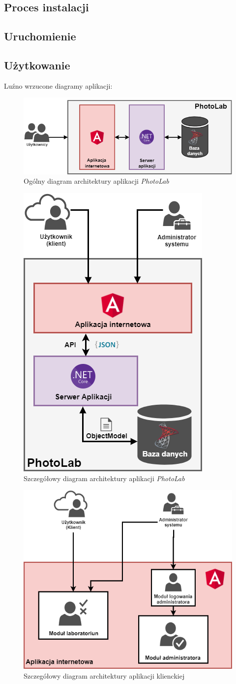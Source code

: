 		\subsection{Proces instalacji}
		\subsection{Uruchomienie}
		\subsection{Użytkowanie}
		
		Luźno wrzucone diagramy aplikacji:
\begin{figure}[ht]
	\centering
	\includegraphics[width=0.7\linewidth]{graphics/general-application-architecture.png}
	\caption{Ogólny diagram architektury aplikacji \textit{PhotoLab}}
	\label{fig:general-application-architecture}
\end{figure}

\begin{figure}[ht]
	\centering
	\includegraphics[width=0.5\linewidth]{graphics/application-architecture-without-payu.png}
	\caption{Szczegółowy diagram architektury aplikacji \textit{PhotoLab}}
	\label{fig:application-architecture-without-payu}
\end{figure}

\begin{figure}[ht]
	\centering
	\includegraphics[width=0.5\linewidth]{graphics/client-architecture.png}
	\caption{Szczegółowy diagram architektury aplikacji klienckiej}
	\label{fig:client-architecture}
\end{figure}